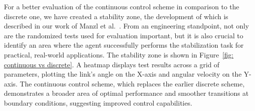 For a better evaluation of the continuous control scheme in comparison to the discrete one, we have created a stability zone, the development of which is described in our work of Manzl et al.~\cite{manzl2023relrl}. From an engineering standpoint, not only are the randomized tests used for evaluation important, but it is also crucial to identify an area where the agent successfully performs the stabilization task for practical, real-world applications. The stability zone is shown in Figure~\ref{fig: continuous vs discrete}. A heatmap displays test results across a grid of parameters, plotting the link's angle on the X-axis and angular velocity on the Y-axis. The continuous control scheme, which replaces the earlier discrete scheme, demonstrates a broader area of optimal performance and smoother transitions at boundary conditions, suggesting improved control capabilities.

